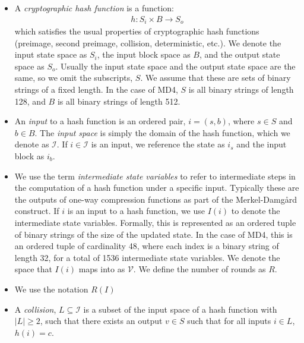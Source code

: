 \documentclass[conference]{IEEEtran}
\begin{document}
\begin{itemize}
    \item A \textit{cryptographic hash function} is a function:
        \begin{align*}
            h: S_{i} \times B \rightarrow S_{o}
        \end{align*}
        which satisfies the usual properties of cryptographic hash functions
        (preimage, second preimage, collision, deterministic, etc.). We denote
        the input state space as $S_{i}$, the input block space as $B$, and the
        output state space as $S_{o}$. Usually the input state space and the
        output state space are the same, so we omit the subscripts, $S$. We
        assume that these are sets of binary strings of a fixed length. In the
        case of MD4, $S$ is all binary strings of length 128, and $B$ is all
        binary strings of length 512.

    \item An \textit{input} to a hash function is an ordered pair, $i = (s, b)$,
        where $s \in S$ and $b \in B$. The \textit{input space} is simply
        the domain of the hash function, which we denote as $\mathcal{I}$.
        If $i \in \mathcal{I}$ is an input, we reference the state as $i_s$
        and the input block as $i_b$.

    \item We use the term \textit{intermediate state variables} to refer to
        intermediate steps in the computation of a hash function under
        a specific input. Typically these are the outputs of
        one-way compression functions as part of the Merkel-Damg{\aa}rd
        construct. If $i$ is an input to a hash function, we use $I(i)$ to
        denote the intermediate state variables. Formally, this is represented
        as an ordered tuple of binary strings of the size of the updated state.
        In the case of MD4, this is an ordered tuple of cardinality 48, where
        each index is a binary string of length 32, for a total of 1536
        intermediate state variables. We denote the space that $I(i)$ maps
        into as $\mathcal{V}$. We define the number of rounds as $R$.

    \item We use the notation $R(I)$

    \item A \textit{collision}, $L \subseteq \mathcal{I}$ is a subset of the
        input space of a hash function with $\big|L\big| \geq 2$, such that
        there exists an output $v \in S$ such that for all inputs $i \in L$,
        $h(i) = c$.


\end{itemize}
\end{document}
